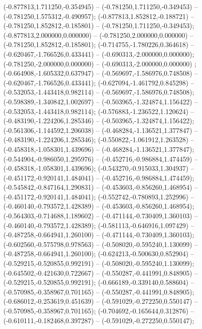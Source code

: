  (-0.877813,1.711250,-0.354945) -- (-0.781250,1.711250,-0.349453) -- (-0.781250,1.575312,-0.490957);
 (-0.877813,1.852812,-0.188721) -- (-0.781250,1.852812,-0.185801) -- (-0.781250,1.711250,-0.349453);
 (-0.877813,2.000000,0.000000) -- (-0.781250,2.000000,0.000000) -- (-0.781250,1.852812,-0.185801);
 (-0.714755,-1.780226,0.364618) -- (-0.620467,-1.766526,0.433441) -- (-0.690313,-2.000000,0.000000);
 (-0.781250,-2.000000,0.000000) -- (-0.690313,-2.000000,0.000000) ;
 (-0.664908,-1.605332,0.637947) -- (-0.569697,-1.586976,0.748508) -- (-0.620467,-1.766526,0.433441);
 (-0.627094,-1.461792,0.845298) -- (-0.532053,-1.443418,0.982114) -- (-0.569697,-1.586976,0.748508);
 (-0.598389,-1.340842,1.002697) -- (-0.503965,-1.324874,1.156422) -- (-0.532053,-1.443418,0.982114);
 (-0.576883,-1.236522,1.120624) -- (-0.483190,-1.224206,1.285346) -- (-0.503965,-1.324874,1.156422);
 (-0.561306,-1.144592,1.206038) -- (-0.468284,-1.136521,1.377847) -- (-0.483190,-1.224206,1.285346);
 (-0.550822,-1.061912,1.263528) -- (-0.458318,-1.058301,1.439696) -- (-0.468284,-1.136521,1.377847);
 (-0.544904,-0.986050,1.295976) -- (-0.452716,-0.986884,1.474459) -- (-0.458318,-1.058301,1.439696);
 (-0.543270,-0.915033,1.304937) -- (-0.451172,-0.920141,1.484041) -- (-0.452716,-0.986884,1.474459);
 (-0.545842,-0.847164,1.290831) -- (-0.453603,-0.856260,1.468954) -- (-0.451172,-0.920141,1.484041);
 (-0.552742,-0.780893,1.252996) -- (-0.460140,-0.793572,1.428389) -- (-0.453603,-0.856260,1.468954);
 (-0.564303,-0.714688,1.189602) -- (-0.471144,-0.730409,1.360103) -- (-0.460140,-0.793572,1.428389);
 (-0.581113,-0.646916,1.097429) -- (-0.487258,-0.664941,1.260100) -- (-0.471144,-0.730409,1.360103);
 (-0.602560,-0.575798,0.978563) -- (-0.508020,-0.595240,1.130099) -- (-0.487258,-0.664941,1.260100);
 (-0.624213,-0.500630,0.852904) -- (-0.529215,-0.520855,0.992191) -- (-0.508020,-0.595240,1.130099);
 (-0.645502,-0.421630,0.722667) -- (-0.550287,-0.441991,0.848905) -- (-0.529215,-0.520855,0.992191);
 (-0.666189,-0.339140,0.588604) -- (-0.570985,-0.358967,0.701165) -- (-0.550287,-0.441991,0.848905);
 (-0.686012,-0.253619,0.451639) -- (-0.591029,-0.272250,0.550147) -- (-0.570985,-0.358967,0.701165);
 (-0.704692,-0.165644,0.312876) -- (-0.610111,-0.182468,0.397287) -- (-0.591029,-0.272250,0.550147);
